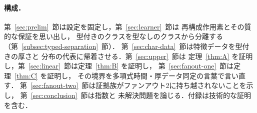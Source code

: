 \paragraph{構成．}
第~\ref{sec:prelim}~節は設定を固定し，第~\ref{sec:learner}~節は
再構成作用素とその質的な保証を思い出し，
型付きのクラスを型なしのクラスから分離する（第~\ref{subsec:typed-separation}~節）．
第~\ref{sec:char-data}~節は特徴データを型付きの厚さと
分布の代表に帰着させる．第~\ref{sec:upper}~節は
定理~\ref{thm:A} を証明し，第~\ref{sec:linear}~節は定理~\ref{thm:B} を証明し，
第~\ref{sec:fanout-one}~節は定理~\ref{thm:C} を証明し，
その境界を多項式時間・厚データ同定の言葉で言い直す．
第~\ref{sec:fanout-two}~節は証拠族がファンアウト2に持ち越されないことを示し，
第~\ref{sec:conclusion}~節は指数と
未解決問題を論じる．付録は技術的な証明を含む．

